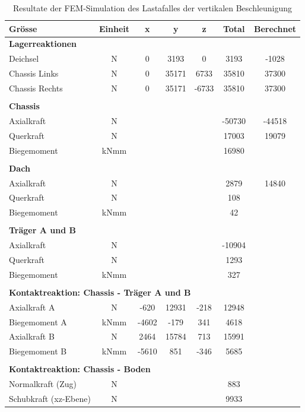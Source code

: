 \begin{table}[H]
\centering
\begin{tabular}{lcccccc}
Grösse	&	Einheit	&	x	&	y	&	z	&	Total	&	Berechnet	\\	\hline
\multicolumn{5}{l}{\textbf{Lagerreaktionen}}									&		&		\\	\thickhline
Deichsel	&	N	&	0	&	3193	&	0	&	3193	&	-1028	\\
Chassis Links	&	N	&	0	&	35171	&	6733	&	35810	&	37300	\\
Chassis Rechts	&	N	&	0	&	35171	&	-6733	&	35810	&	37300	\\	\hline	\\
\multicolumn{5}{l}{\textbf{Chassis}}									&		&		\\	\thickhline
Axialkraft	&	N	&		&		&		&	-50730	&	-44518	\\
Querkraft	&	N	&		&		&		&	17003	&	19079	\footnotemark \\
Biegemoment	&	kNmm	&		&		&		&	16980	&		\\	\hline	\\
\multicolumn{5}{l}{\textbf{Dach}}									&		&		\\	\thickhline
Axialkraft	&	N	&		&		&		&	2879	&	14840	\\
Querkraft	&	N	&		&		&		&	108	&		\\
Biegemoment	&	kNmm	&		&		&		&	42	&		\\	\hline	\\
\multicolumn{5}{l}{\textbf{Träger A und B}}													\\	\thickhline
Axialkraft	&	N	&		&		&		&	-10904	&		\\
Querkraft	&	N	&		&		&		&	1293	&		\\
Biegemoment	&	kNmm	&		&		&		&	327	&		\\	\hline	\\
\multicolumn{5}{l}{\textbf{Kontaktreaktion: Chassis - Träger A und B}}									&		&		\\	\thickhline
 Axialkraft A	&	N	&	-620	&	12931	&	-218	&	12948	&		\\
Biegemoment A	&	kNmm	&	-4602	&	-179	&	341	&	4618	&		\\
Axialkraft B	&	N	&	2464	&	15784	&	713	&	15991	&		\\
Biegemoment B	&	kNmm	&	-5610	&	851	&	-346	&	5685	&		\\	\hline	\\
\multicolumn{5}{l}{\textbf{Kontaktreaktion: Chassis - Boden}}									&		&		\\	\thickhline
Normalkraft (Zug)	&	N	&		&		&		&	883	&		\\
Schubkraft (xz-Ebene)	&	N	&		&		&		&	9933	&		\\	\hline
\end{tabular}
\caption{Resultate der FEM-Simulation des Lastafalles der vertikalen Beschleunigung}
\label{tab:FEM 1.1}
\end{table}

